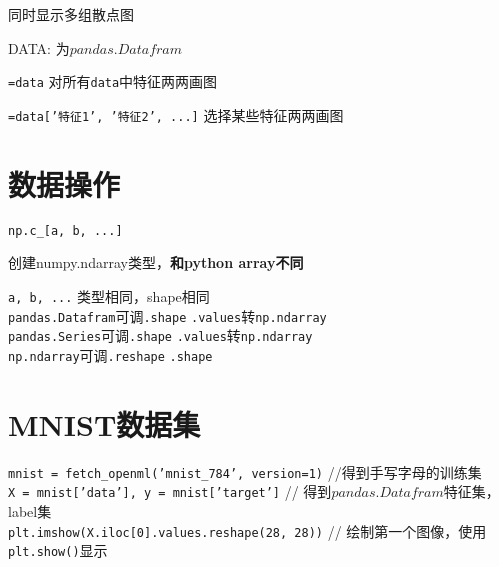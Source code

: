 \documentclass[UTF8]{ctexart}
\begin{document}
  同时显示多组散点图

  DATA: 为$pandas.Datafram$
  
  \quad \texttt{=data} 对所有\texttt{data}中特征两两画图

  \quad \texttt{=data['特征1', '特征2', ...]} 选择某些特征两两画图

\section{数据操作}
\noindent \texttt{np.c\_[a, b, ...]}

  创建numpy.ndarray类型，\textbf{和python array不同}

  \texttt{a, b, ...} 类型相同，shape相同\\
\texttt{pandas.Datafram}可调\texttt{.shape} \texttt{.values}转\texttt{np.ndarray}\\
\texttt{pandas.Series}可调\texttt{.shape} \texttt{.values}转\texttt{np.ndarray}\\
\texttt{np.ndarray}可调\texttt{.reshape} \texttt{.shape}

\section{MNIST数据集}
\noindent \texttt{mnist = fetch\_openml('mnist\_784', version=1)} //得到手写字母的训练集\\
\texttt{X = mnist['data'], y = mnist['target']} // 得到$pandas.Datafram$特征集，label集\\
\texttt{plt.imshow(X.iloc[0].values.reshape(28, 28))} // 绘制第一个图像，使用\texttt{plt.show()}显示\\
\end{document}
